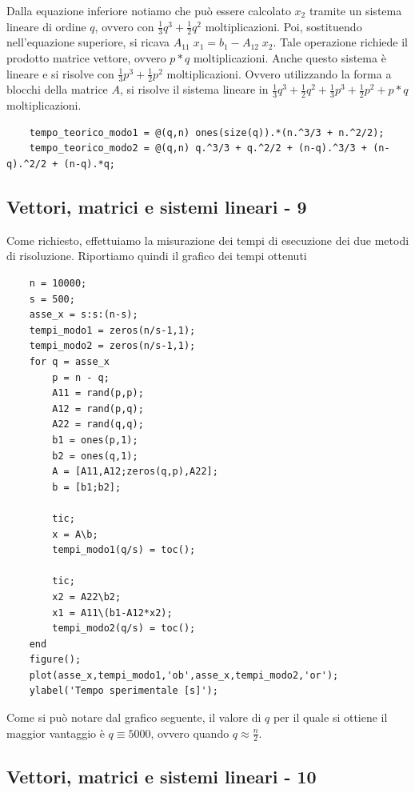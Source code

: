 \documentclass{article}
\begin{document}
Dalla equazione inferiore notiamo che può essere calcolato $x_2$ tramite un sistema lineare di ordine $q$, ovvero con $\frac{1}{3}q^3 +\frac{1}{2}q^2$ moltiplicazioni. Poi, sostituendo nell'equazione superiore, si ricava $A_{11} \;x_1 =b_1 -A_{12} \;x_2$. Tale operazione richiede il prodotto matrice vettore, ovvero $p*q$ moltiplicazioni. Anche questo sistema è lineare e si risolve con $\frac{1}{3}p^3 +\frac{1}{2}p^2$ moltiplicazioni. Ovvero utilizzando la forma a blocchi della matrice $A$, si risolve il sistema lineare in $\frac{1}{3}q^3 +\frac{1}{2}q^2 +\frac{1}{3}p^3 +\frac{1}{2}p^2 +p*q$ moltiplicazioni.

\begin{lstlisting}
	tempo_teorico_modo1 = @(q,n) ones(size(q)).*(n.^3/3 + n.^2/2);
	tempo_teorico_modo2 = @(q,n) q.^3/3 + q.^2/2 + (n-q).^3/3 + (n-q).^2/2 + (n-q).*q;
\end{lstlisting}

\clearpage
\subsection*{Vettori, matrici e sistemi lineari - 9}

Come richiesto, effettuiamo la misurazione dei tempi di esecuzione dei due metodi di risoluzione. Riportiamo quindi il grafico dei tempi ottenuti

\begin{lstlisting}
	n = 10000;
	s = 500;
	asse_x = s:s:(n-s);
	tempi_modo1 = zeros(n/s-1,1);
	tempi_modo2 = zeros(n/s-1,1);
	for q = asse_x
		p = n - q;
		A11 = rand(p,p);
		A12 = rand(p,q);
		A22 = rand(q,q);
		b1 = ones(p,1);
		b2 = ones(q,1);
		A = [A11,A12;zeros(q,p),A22];
		b = [b1;b2];
		
		tic;
		x = A\b;
		tempi_modo1(q/s) = toc();
		
		tic;
		x2 = A22\b2;
		x1 = A11\(b1-A12*x2);
		tempi_modo2(q/s) = toc();
	end
	figure();
	plot(asse_x,tempi_modo1,'ob',asse_x,tempi_modo2,'or');
	ylabel('Tempo sperimentale [s]');
\end{lstlisting}


Come si può notare dal grafico seguente, il valore di $q$ per il quale si ottiene il maggior vantaggio è $q\equiv 5000$, ovvero quando $q\approx \frac{n}{2}$.



\clearpage
\subsection*{Vettori, matrici e sistemi lineari - 10}
\end{document}
